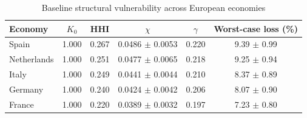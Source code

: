 \begin{table}[htbp]
\centering
\caption{Baseline structural vulnerability across European economies}
\label{tab:baseline_vulnerability_v7}
\small
\begin{tabular}{lccccc}
\toprule
Economy & $K_0$ & HHI & $\chi$ & $\gamma$ & Worst-case loss (\%) \\
\midrule
Spain & 1.000 & 0.267 & 0.0486 $\pm$ 0.0053 & 0.220 & 9.39 $\pm$ 0.99 \\
Netherlands & 1.000 & 0.251 & 0.0477 $\pm$ 0.0065 & 0.218 & 9.25 $\pm$ 0.94 \\
Italy & 1.000 & 0.249 & 0.0441 $\pm$ 0.0044 & 0.210 & 8.37 $\pm$ 0.89 \\
Germany & 1.000 & 0.240 & 0.0424 $\pm$ 0.0042 & 0.206 & 8.07 $\pm$ 0.90 \\
France & 1.000 & 0.220 & 0.0389 $\pm$ 0.0032 & 0.197 & 7.23 $\pm$ 0.80 \\
\bottomrule
\end{tabular}
\end{table}